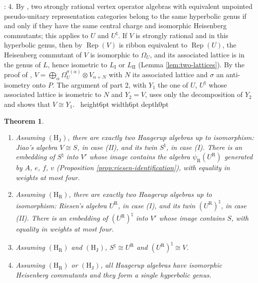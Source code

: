 \documentclass[leqno]{article}
\newcommand{\qed}{\hfill \vrule height6pt  width6pt depth0pt}
\newcommand{\ot}{\otimes}
\DeclareMathOperator{\Rep}{Rep}
\newtheorem{thm}{Theorem}[section]
\newenvironment{proof}[1][]{\noindent {\it Proof #1} : }{\hbox{~}\qed
\smallskip
}
\numberwithin{equation}{section}
\begin{document}
\begin{proof}
4. By \cite[Corollary 4.10]{MoR24a}, two strongly rational vertex operator algebras with equivalent unpointed pseudo-unitary representation categories belong to the same hyperbolic genus if and only if they have the same central charge and isomorphic Heisenberg commutants; this applies to $U$ and $U^\natural$. If $V$ is strongly rational and in this hyperbolic genus, then by \cite[Theorems 4.7 and 4.8]{MoR24a} $\Rep(V)$ is ribbon equivalent to $\Rep(U)$, the Heisenberg commutant of $V$ is isomorphic to $\Omega_U$, and its associated lattice is in the genus of $L$, hence isometric to $L_{\mathrm I}$ or $L_{\mathrm{II}}$ (Lemma \ref{lem:two-lattices}). By the proof of \cite[Corollary 4.10]{MoR24a}, $V = \bigoplus_\alpha \Omega_U^{\sigma(\alpha)} \ot V_{\alpha+N}$ with $N$ its associated lattice and $\sigma$ an anti-isometry onto $P$. The argument of part 2, with $Y_1$ the one of $U$, $U^\natural$ whose associated lattice is isometric to $N$ and $Y_2 = V$, uses only the decomposition of $Y_2$ and shows that $V \cong Y_1$.
\end{proof}

\begin{thm}
\label{thm:classification-one}
\begin{enumerate}
\item Assuming $\mathrm{(H_J)}$, there are exactly two Haagerup algebras up to isomorphism: Jiao's algebra $V \cong S$, in case (II), and its twin $S^\natural$, in case (I). There is an embedding of $S^\natural$ into $V'$ whose image contains the algebra $\psi_{\mathrm R}(U^{\mathrm R})$ generated by $A$, $e$, $f$, $v$ (Proposition \ref{prop:riesen-identification}), with equality in weights at most four.
\item Assuming $\mathrm{(H_R)}$, there are exactly two Haagerup algebras up to isomorphism: Riesen's algebra $U^{\mathrm R}$, in case (I), and its twin $(U^{\mathrm R})^\natural$, in case (II). There is an embedding of $(U^{\mathrm R})^\natural$ into $V'$ whose image contains $S$, with equality in weights at most four.
\item Assuming $\mathrm{(H_R)}$ and $\mathrm{(H_J)}$, $S^\natural \cong U^{\mathrm R}$ and $(U^{\mathrm R})^\natural \cong V$.
\item Assuming $\mathrm{(H_R)}$ or $\mathrm{(H_J)}$, all Haagerup algebras have isomorphic Heisenberg commutants and they form a single hyperbolic genus.
\end{enumerate}
\end{thm}
\end{document}
